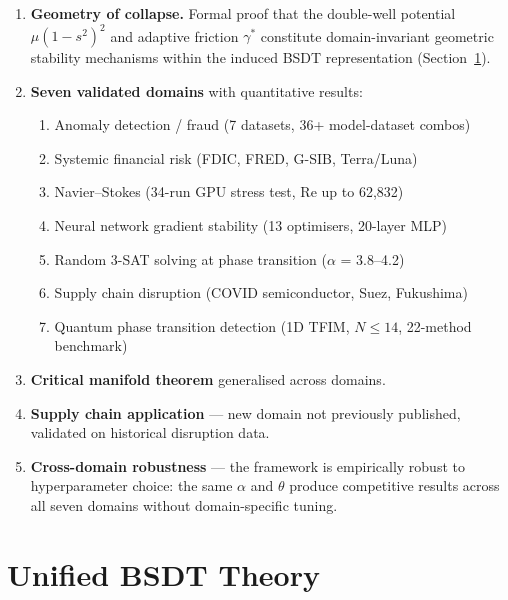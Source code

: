 \documentclass[11pt,a4paper]{article}
\begin{document}
\begin{enumerate}
  \item \textbf{Geometry of collapse.} Formal proof that the
        double-well potential $\mu(1-s^2)^2$ and adaptive friction
        $\gamma^*$ constitute domain-invariant geometric stability
        mechanisms within the induced BSDT representation
        (Section~\ref{sec:theory}).

  \item \textbf{Seven validated domains} with quantitative results:
  \begin{enumerate}[label=(\alph*)]
    \item Anomaly detection / fraud (7 datasets, 36+ model-dataset combos)
    \item Systemic financial risk (FDIC, FRED, G-SIB, Terra/Luna)
    \item Navier--Stokes (34-run GPU stress test, Re up to 62,832)
    \item Neural network gradient stability (13 optimisers, 20-layer MLP)
    \item Random 3-SAT solving at phase transition ($\alpha$ = 3.8--4.2)
    \item Supply chain disruption (COVID semiconductor, Suez, Fukushima)
    \item Quantum phase transition detection (1D TFIM, $N \le 14$,
          22-method benchmark)
  \end{enumerate}

  \item \textbf{Critical manifold theorem} generalised across domains.

  \item \textbf{Supply chain application} — new domain not previously
        published, validated on historical disruption data.

  \item \textbf{Cross-domain robustness} — the framework is
        empirically robust to hyperparameter choice: the same
        $\alpha$ and $\theta$ produce competitive results across
        all seven domains without domain-specific tuning.
\end{enumerate}


\section{Unified BSDT Theory}\label{sec:theory}
\end{document}
